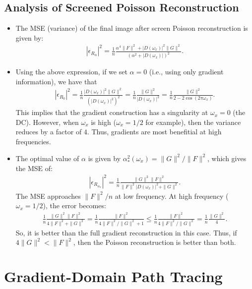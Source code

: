 \documentclass[10pt]{article}
\begin{document}
  \subsection{Analysis of Screened Poisson Reconstruction}
  \begin{itemize}
  	\item The MSE (variance) of the final image after screen Poisson reconstruction is given by:
  	\begin{align*}
  		|\epsilon_{R_\alpha}|^2 = \frac{1}{n} \frac{\alpha^4 \| F \|^2 + |D(\omega_x)|^2 \| G \|^2}{(\alpha^2 + |D(\omega_x)|)^2}.
  	\end{align*}

  	\item Using the above expression, if we set $\alpha = 0$ (i.e., using only gradient information), we have that
  	\begin{align*}
  		|\epsilon_{R_0}|^2 
  		= \frac{1}{n} \frac{|D(\omega_x)|^2 \| G \|^2}{(|D(\omega_x)|^2)^2}
  		= \frac{1}{n} \frac{ \| G \|^2}{|D(\omega_x)|^2}
  		= \frac{1}{n} \frac{ \| G \|^2}{2 - 2\cos(2\pi\omega_x)}.
  	\end{align*}
  	This implies that the gradient construction has a singularity at $\omega_x = 0$ (the DC).  However, when $\omega_x$ is high ($\omega_x = 1/2$ for example), then the variance reduces by a factor of $4$.  Thus, gradients are most benefitial at high frequencies.

  	\item The optimal value of $\alpha$ is given by $\alpha^2_*(\omega_x) = \| G \|^2 / \| F \|^2$, which gives the MSE of:
  	\begin{align*}
  		|\epsilon_{R_{\alpha_x}}|^2 = \frac{1}{n} \frac{\| G \|^2 \| F \|^2}{\| F \|^2 |D(\omega_x)|^2 + \| G \|^2}.
  	\end{align*}
  	The MSE approaches $\| F \|^2 /n $ at low frequency.  At high frequency ($\omega_x = 1/2$), the error becomes:
  	\begin{align*}
  		\frac{1}{n} \frac{\| G\|^2 \| F \|^2}{4 \| F \|^2  + \| G \|^2}
  		= \frac{1}{n} \frac{\| F \|^2}{4 \| F \|^2 / \| G \|^2  + 1}
  		\leq \frac{1}{n} \frac{\| F \|^2}{4 \| F \|^2 / \| G \|^2}
  		= \frac{1}{n} \frac{\| G \|^2}{4}.
  	\end{align*}
  	So, it is better than the full gradient reconstruction in this case.  Thus, if $4\| G\|^2 < \| F \|^2$, then the Poisson reconstruction is better than both.
  \end{itemize}

  \section{Gradient-Domain Path Tracing}
  
\end{document}
